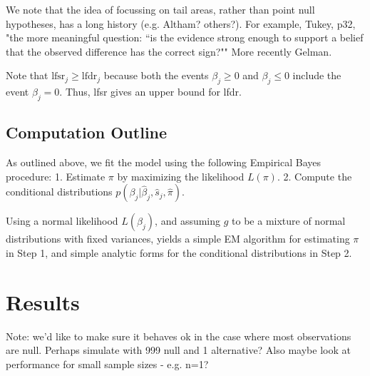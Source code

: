 \documentclass[11pt]{article}
\def\bhat{\hat{\beta}}
\def\shat{\hat{s}}
\begin{document}
We note that the idea of focussing on tail areas, rather than point null hypotheses,
has a long history (e.g. Altham? others?). For example, 
Tukey, p32, "the more meaningful question: ``is the evidence strong enough to support a belief that the observed difference has the correct sign?""
More recently Gelman.


Note that $\text{lfsr}_j \geq \text{lfdr}_j$ 
because both the events $\beta_j \geq 0$
and $\beta_j \leq 0$ include the event $\beta_j=0$.
Thus, lfsr gives an upper bound for lfdr.






\subsection{Computation Outline}

As outlined above, we fit the model using the following Empirical Bayes procedure:
1. Estimate $\pi$ by maximizing the likelihood $L(\pi)$.
2. Compute the conditional distributions $p(\beta_j | \bhat_j, \shat_j, \hat\pi)$.

Using a normal likelihood $L(\beta_j)$, and assuming
$g$ to be a mixture of normal distributions with fixed variances, 
yields a simple EM algorithm
for estimating $\pi$ in Step 1, and simple analytic forms for the conditional
distributions in Step 2.


\section*{Results}

Note: we'd like to make sure it behaves ok in the case where most observations are null.
Perhaps simulate with 999 null and 1 alternative?
Also maybe look at performance for small sample sizes - e.g. n=1?
\end{document}
